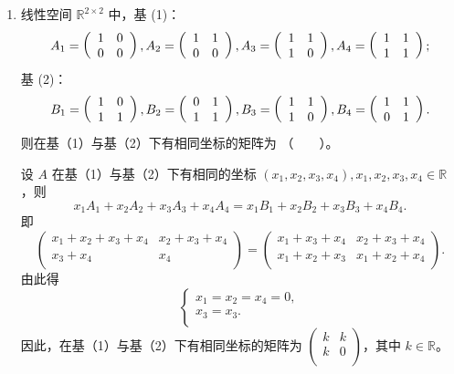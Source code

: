 \begin{enumerate}[1~]
\begin{enumerate}[1.~]
\item
线性空间 $\mathbb{R}^{2\times2}$ 中，基 (1)：
$$
A _ { 1 } = \left( \begin{array} { c c } { 1 } & { 0 } \\ { 0 } & { 0 } \end{array} \right) , A _ { 2 } = \left( \begin{array} { c c } { 1 } & { 1 } \\ { 0 } & { 0 } \end{array} \right) , A _ { 3 } = \left( \begin{array} { c c } { 1 } & { 1 } \\ { 1 } & { 0 } \end{array} \right) , A _ { 4 } = \left( \begin{array} { c c } { 1 } & { 1 } \\ { 1 } & { 1 } \end{array} \right);
$$
基 (2)：
$$
B _ { 1 } = \left( \begin{array} { c c } { 1 } & { 0 } \\ { 1 } & { 1 } \end{array} \right) , B _ { 2 } = \left( \begin{array} { c c } { 0 } & { 1 } \\ { 1 } & { 1 } \end{array} \right) , B _ { 3 } = \left( \begin{array} { c c } { 1 } & { 1 } \\ { 1 } & { 0 } \end{array} \right) , B _ { 4 } = \left( \begin{array} { c c } { 1 } & { 1 } \\ { 0 } & { 1 } \end{array} \right).
$$
则在基（1）与基（2）下有相同坐标的矩阵为 （\ \ \ \ ）。
\begin{solution}
设 $A$ 在基（1）与基（2）下有相同的坐标 $(x_1, x_2, x_3, x_4), x_1, x_2, x_3, x_4\in \mathbb{R}$，则\[
x_1 A_1 +x_2 A_2 +x_3 A_3 +x_4 A_4 = x_1 B_1 +x_2 B_2 +x_3 B_3 +x_4 B_4.
\]
即
\[
\left( \begin{matrix}
	x_1+x_2+x_3+x_4&		x_2+x_3+x_4\\
	x_3+x_4&		x_4\\
\end{matrix} \right) =\left( \begin{matrix}
	x_1+x_3+x_4&		x_2+x_3+x_4\\
	x_1+x_2+x_3&		x_1+x_2+x_4\\
\end{matrix} \right) .
\]
由此得\[
\left\{ \begin{array}{l}
	x_1=x_2=x_4=0,\\
	x_3=x_3.\\
\end{array} \right. 
\]
因此，在基（1）与基（2）下有相同坐标的矩阵为 $\left( \begin{smallmatrix}
	k&		k\\
	k&		0\\
\end{smallmatrix} \right) $，其中 $k \in \mathbb{R}$。
\end{solution}


\end{enumerate}
\end{enumerate}
